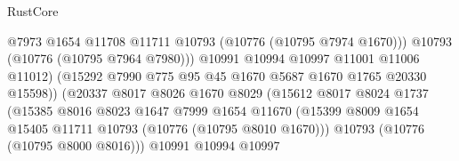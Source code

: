 \begin{lexlean}{RustCore}
\begin{coremodule}
                                            @7973
                                            @1654
                                            @11708
                                            @11711
                                            @10793
                                            (@10776 (@10795 @7974 @1670)))
                                          @10793
                                          (@10776 (@10795 @7964 @7980)))
                                        @10991
                                        @10994
                                        @10997
                                        @11001
                                        @11006
                                        @11012)
                                      (@15292
                                        @7990
                                        @775
                                        @95
                                        @45
                                        @1670
                                        @5687
                                        @1670
                                        @1765
                                        @20330
                                        @15598))
                                    (@20337
                                      @8017
                                      @8026
                                      @1670
                                      @8029
                                      (@15612
                                        @8017
                                        @8024
                                        @1737
                                        (@15385
                                          @8016
                                          @8023
                                          @1647
                                          @7999
                                          @1654
                                          @11670
                                          (@15399
                                            @8009
                                            @1654
                                            @15405
                                            @11711
                                            @10793
                                            (@10776 (@10795 @8010 @1670)))
                                          @10793
                                          (@10776 (@10795 @8000 @8016)))
                                        @10991
                                        @10994
                                        @10997

\end{coremodule}
\end{lexlean}
